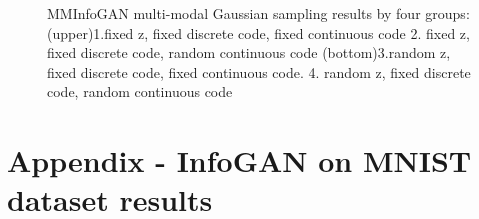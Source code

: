\documentclass[letterpaper,12pt]{article}
\begin{document}
\begin{figure}[H]
	\hspace{10px}  
    
    
    \caption{\label{figure 10}MMInfoGAN multi-modal Gaussian sampling results by four groups:(upper)1.fixed z, fixed discrete code, fixed continuous code 2. fixed z, fixed discrete code, random continuous code (bottom)3.random z, fixed discrete code, fixed continuous code. 4. random z, fixed discrete code, random continuous code }
\end{figure}


\section{Appendix - InfoGAN on \textbf{MNIST} dataset results}
\begin{figure}[H]  
    \hspace{10px}
    \hspace{10px}

\end{figure}
\end{document}
